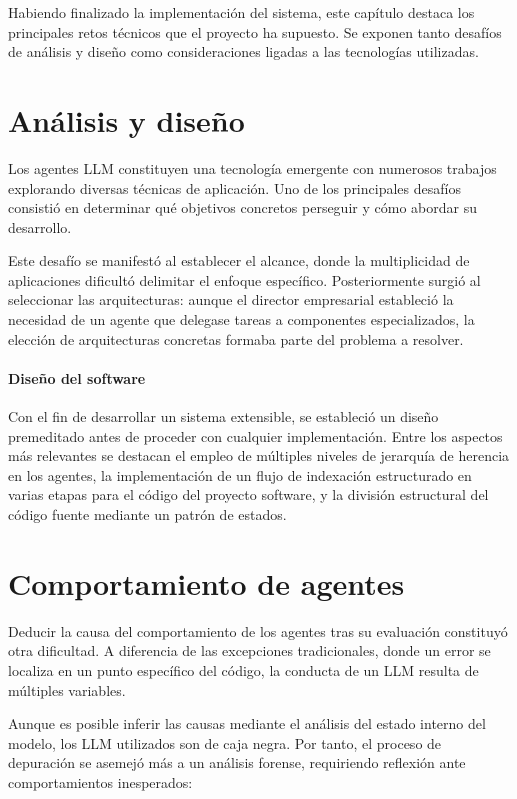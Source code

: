 Habiendo finalizado la implementación del sistema, este capítulo destaca los principales retos técnicos que el proyecto ha supuesto. Se exponen tanto desafíos de análisis y diseño como consideraciones ligadas a las tecnologías utilizadas. 

\section{Análisis y diseño}
Los agentes LLM constituyen una tecnología emergente con numerosos trabajos explorando diversas técnicas de aplicación. Uno de los principales desafíos consistió en determinar qué objetivos concretos perseguir y cómo abordar su desarrollo.

Este desafío se manifestó al establecer el alcance, donde la multiplicidad de aplicaciones dificultó delimitar el enfoque específico. Posteriormente surgió al seleccionar las arquitecturas: aunque el director empresarial estableció la necesidad de un agente que delegase tareas a componentes especializados, la elección de arquitecturas concretas formaba parte del problema a resolver.

\paragraph{Diseño del software}
Con el fin de desarrollar un sistema extensible, se estableció un diseño premeditado antes de proceder con cualquier implementación. Entre los aspectos más relevantes se destacan el empleo de múltiples niveles de jerarquía de herencia en los agentes, la implementación de un flujo de indexación estructurado en varias etapas para el código del proyecto software, y la división estructural del código fuente mediante un patrón de estados.

\section{Comportamiento de agentes}
Deducir la causa del comportamiento de los agentes tras su evaluación constituyó otra dificultad. A diferencia de las excepciones tradicionales, donde un error se localiza en un punto específico del código, la conducta de un LLM resulta de múltiples variables.

Aunque es posible inferir las causas mediante el análisis del estado interno del modelo, los LLM utilizados son de caja negra. Por tanto, el proceso de depuración se asemejó más a un análisis forense, requiriendo reflexión ante comportamientos inesperados:

